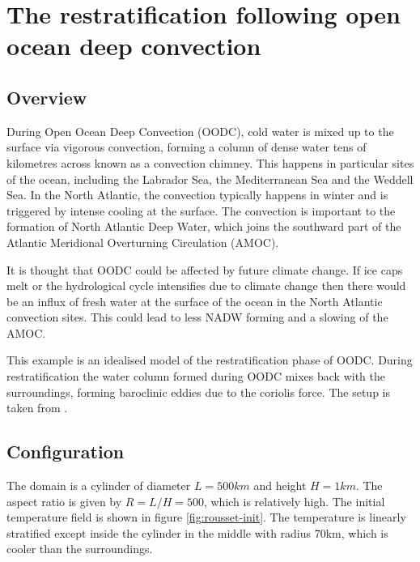 \section{The restratification following open ocean deep convection}
\label{sec:restratification_after_oodc}

\subsection{Overview}

During Open Ocean Deep Convection (OODC), cold water is mixed up to the surface via vigorous convection, forming a column of dense water tens of kilometres across known as a convection chimney. This happens in particular sites of the ocean, including the Labrador Sea, the Mediterranean Sea and the Weddell Sea.  In the North Atlantic, the convection typically happens in winter and is triggered by intense cooling at the surface. The convection is important to the formation of North Atlantic Deep Water, which joins the southward part of the Atlantic Meridional Overturning Circulation (AMOC).

It is thought that OODC could be affected by future climate change. If ice caps melt or the hydrological cycle intensifies due to climate change then there would be an influx of fresh water at the surface of the ocean in the North Atlantic convection sites. This could lead to less NADW forming and a slowing of the AMOC.  

This example is an idealised model of the restratification phase of OODC. During restratification the water column formed during OODC mixes back with the surroundings, forming baroclinic eddies due to the coriolis force. The setup is taken from  \cite{rousset09}. 

\subsection{Configuration}

The domain is a cylinder of diameter $L=500\unit{km}$ and height $H=1\unit{km}$. The aspect ratio is given by $R=L/H=500$, which is relatively high.  The initial temperature field is shown in figure \ref{fig:rousset-init}. The temperature is linearly stratified except inside the cylinder in the middle with radius 70km, which is cooler than the surroundings. 

